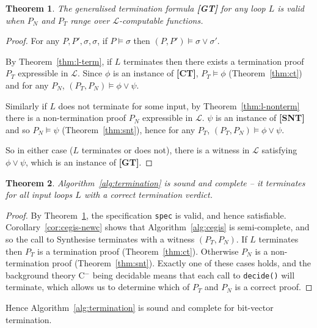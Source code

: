 \documentclass[preprint]{sigplanconf}
\newtheorem{theorem}{Theorem}
\theoremstyle{definition}
\newcommand{\newC}{C$^-$\xspace}
\begin{document}
\begin{theorem}
 \label{thm:generalised-sat}
 The generalised termination formula {\bf [GT]} for any loop $L$ is valid
 when $P_N$ and $P_T$ range over \mbox{$\mathcal{L}$-computable} functions.
\end{theorem}

\begin{proof}
 For any $P, P', \sigma, \sigma$, if $P \models \sigma$ then $(P, P') \models \sigma \vee \sigma'$.

 By Theorem~\ref{thm:l-term}, if $L$ terminates then there exists a termination proof $P_T$ expressible
 in $\mathcal{L}$.  Since $\phi$ is an instance of {\bf [CT]}, $P_T \models \phi$ (Theorem~\ref{thm:ct}) and
 for any $P_N$, $(P_T, P_N) \models \phi \vee \psi$.

 Similarly if $L$ does not terminate for some input, by Theorem~\ref{thm:l-nonterm} there is a non-termination
 proof $P_N$ expressible in $\mathcal{L}$.  $\psi$ is an instance of {\bf [SNT]} and so $P_N \models \psi$
 (Theorem~\ref{thm:snt}), hence for any $P_T$, $(P_T, P_N) \models \phi \vee \psi$.

 So in either case ($L$ terminates or does not), there is a witness in $\mathcal{L}$ satisfying
 $\phi \vee \psi$, which is an instance of {\bf [GT]}.
\end{proof}

\begin{theorem}
 Algorithm~\ref{alg:termination} is sound and complete -- it terminates for all input loops $L$ with
 a correct termination verdict.
\end{theorem}

\begin{proof}
 By Theorem~\ref{thm:generalised-sat}, the specification \lstinline!spec! is valid, and hence satisfiable.  Corollary~\ref{cor:cegis-newc}
 shows that Algorithm~\ref{alg:cegis} is semi-complete, and so the call to {\sc Synthesise} terminates with a witness $(P_T, P_N)$.
 If $L$ terminates then $P_T$ is a termination proof (Theorem~\ref{thm:ct}).  Otherwise $P_N$ is a non-termination proof
 (Theorem~\ref{thm:snt}).  Exactly one of these cases holds, and the background theory \newC being decidable means that each
 call to \lstinline|decide()| will terminate, which allows us to determine which of $P_T$ and $P_N$ is a correct proof.
\end{proof}

Hence Algorithm~\ref{alg:termination} is sound and complete for bit-vector termination.
\end{document}
